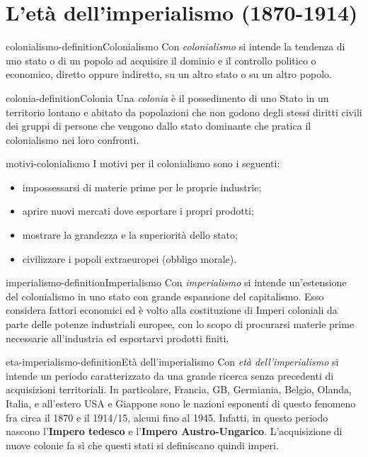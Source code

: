 \documentclass[preview]{standalone}
\begin{document}
\genpage

\section{L'età dell'imperialismo (1870-1914)} %

\begin{snippetdefinition}{colonialismo-definition}{Colonialismo}
    Con \textit{colonialismo} si intende la tendenza di uno stato o di un popolo ad acquisire
    il dominio e il controllo politico
    o economico, diretto oppure indiretto, su un altro stato o su un altro popolo.
\end{snippetdefinition}

\begin{snippetdefinition}{colonia-definition}{Colonia}
    Una \textit{colonia} è il possedimento di uno Stato in un territorio
    lontano e abitato da popolazioni che non godono
    degli stessi diritti civili dei gruppi di persone che vengono dallo stato dominante
    che pratica il colonialismo nei loro confronti.
\end{snippetdefinition}

\begin{snippet}{motivi-colonialismo}
    I motivi per il colonialismo sono i seguenti:
    \begin{itemize}
        \item impossessarsi di materie prime per le proprie industrie;
        \item aprire nuovi mercati dove esportare i propri prodotti;
        \item mostrare la grandezza e la superiorità dello stato;
        \item civilizzare i popoli extraeuropei (obbligo morale).
    \end{itemize}
\end{snippet}

\begin{snippetdefinition}{imperialismo-definition}{Imperialismo}
    Con \textit{imperialismo} si intende un'estensione del colonialismo
    in uno stato con grande espansione del capitalismo.
    Esso considera fattori economici ed è volto alla costituzione di Imperi coloniali da parte
    delle potenze industriali europee, con lo scopo di procurarsi materie prime necessarie all'industria ed esportarvi prodotti finiti.
\end{snippetdefinition}

\begin{snippetdefinition}{eta-imperialismo-definition}{Età dell'imperialismo}
    Con \textit{età dell'imperialismo} si intende un periodo
    caratterizzato da una grande ricerca senza precedenti di acquisizioni territoriali.
    In particolare, Francia, GB, Germiania, Belgio, Olanda, Italia, e all'estero
    USA e Giappone sono le nazioni esponenti di questo fenomeno
    fra circa il 1870 e il 1914/15, alcuni fino al 1945.
    Infatti, in questo periodo nascono l'\textbf{Impero tedesco} e l'\textbf{Impero Austro-Ungarico}.
    L'acquisizione di nuove colonie fa sì che questi stati si definiscano quindi imperi.
\end{snippetdefinition}
\end{document}
